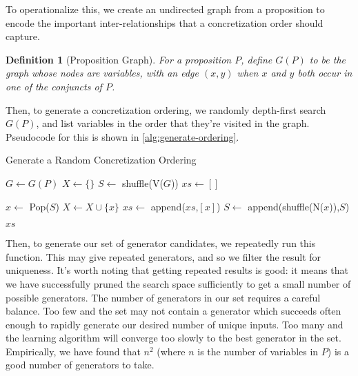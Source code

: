 \documentclass[10pt,a4paper]{article}
\newtheorem{definition}{Definition}
\begin{document}
To operationalize this, we create an undirected graph from a proposition to encode the important inter-relationships that a concretization order should capture.

\begin{definition}[Proposition Graph]
For a proposition $P$, define $G(P)$ to be the graph whose nodes are variables, with an edge $(x,y)$ when $x$ and $y$ both occur in one of the conjuncts of $P$.
\end{definition}

Then, to generate a concretization ordering, we randomly depth-first search $G(P)$, and list variables in the order that they're visited in the graph. Pseudocode for this is shown in \autoref{alg:generate-ordering}.

\begin{algorithm}
    \caption{Generate a Random Concretization Ordering}
    \label{alg:generate-ordering}
    \begin{algorithmic}
      \State $G \gets G(P)$ 
      \State $X \gets \{\}$
      \State $S \gets $ shuffle(V($G$))
      \State $xs \gets []$
      
       \State $x \gets $ Pop($S$)
         \State $X \gets X \cup \{x\}$
         \State $xs \gets $ append($xs$,$[x]$)
         \State $S \gets $ append(shuffle(N($x$)),$S$)
       \EndIf

      \EndWhile
      
      \Return $xs$
      
      \EndFunction
    \end{algorithmic}
\end{algorithm}

Then, to generate our set of generator candidates, we repeatedly run this function. This may give repeated generators, and so we filter the result for uniqueness. It's worth noting that getting repeated results is good: it means that we have successfully pruned the search space sufficiently to get a small number of possible generators. The number of generators in our set requires a careful balance. Too few and the set may not contain a generator which succeeds often enough to rapidly generate our desired number of unique inputs. Too many and the learning algorithm will converge too slowly to the best generator in the set. Empirically, we have found that $n^2$ (where $n$ is the number of variables in $P$) is a good number of generators to take.
\end{document}
